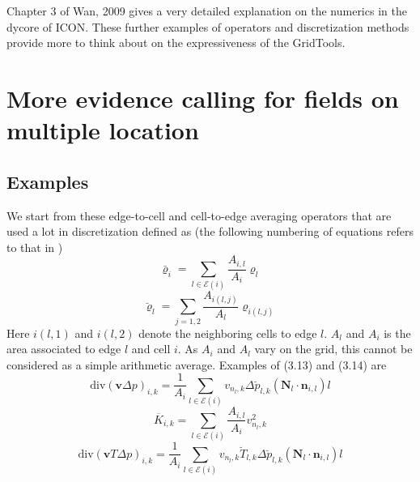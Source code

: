 \documentclass[12pt]{article}
\begin{document}
  Chapter 3 of Wan, 2009 \cite{Wan} gives a very detailed explanation on the numerics in the dycore of ICON. These further examples of operators and discretization methods provide more to think about on the expressiveness of the GridTools.

  \section{More evidence calling for fields on multiple location}
  \subsection{Examples}
  We start from these edge-to-cell and cell-to-edge averaging operators that are used a lot in discretization defined as (the following numbering of equations refers to that in \cite{Wan})
  \begin{equation}
      \bar{\varrho}_i=\sum\limits_{l \in \mathcal{E}(i)}\frac{A_{i,l}}{A_i}\varrho_{l} \tag{3.13}
  \end{equation}
  \begin{equation}
      \breve{\varrho}_l=\sum\limits_{j=1,2}\frac{A_{i(l,j)}}{A_l}\varrho_{i(l,j)} \tag{3.14}
  \end{equation}
  Here $i(l,1)$ and $i(l,2)$ denote the neighboring cells to edge $l$. $A_l$ and $A_i$ is the area associated to edge $l$ and cell $i$. As $A_i$ and $A_l$ vary on the grid, this cannot be considered as a simple arithmetic average. Examples of (3.13) and (3.14) are
  \begin{equation}
    \text{div}(\bm{v}\Delta p)_{i, k}=\frac{1}{A_i} \sum\limits_{l\in\mathcal{E}(i)}v_{n_l,k}\Delta\breve{p}_{l,k}(\bm{N}_l\cdot\bm{n}_{i,l})l
    \tag{3.18}
  \end{equation}
  \begin{equation}
    \overline{K}_{i,k}=\sum\limits_{l\in\mathcal{E}(i)} \frac{A_{i,l}}{A_i}v^2_{n_l,k}
    \tag{3.25}
  \end{equation}
  \begin{equation}
    \text{div}(\bm{v}T\Delta p)_{i, k}=\frac{1}{A_i} \sum\limits_{l\in\mathcal{E}(i)}v_{n_l,k}\breve{T}_{l,k}\Delta\breve{p}_{l,k}(\bm{N}_l\cdot\bm{n}_{i,l})l
    \tag{3.18}
  \end{equation}
\end{document}
